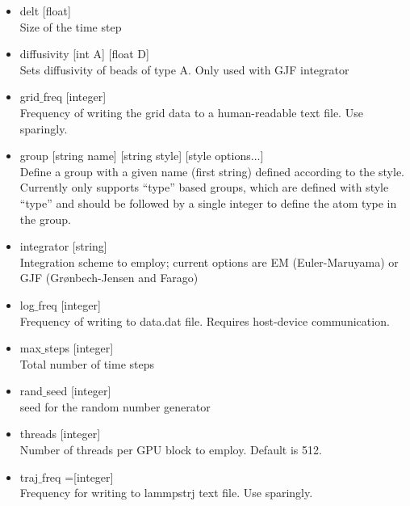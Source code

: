 \documentclass[12pt]{article}
\begin{document}
\begin{itemize}
    
    \item
    delt [float]
    \\[8pt]
    Size of the time step
    
    
    \item
    diffusivity [int A] [float D]
    \\[8pt]
    Sets diffusivity of beads of type A. Only used with GJF integrator
    
    
    \item
    grid$\_$freq [integer]
    \\[8pt]
    Frequency of writing the grid data to a human-readable text file. Use sparingly.
    
	\item
	group [string name] [string style] [style options...]
	\\[8pt]
	Define a group with a given name (first string) defined according to the style. Currently only supports ``type'' based groups, which are defined with style ``type'' and should be followed by a single integer to define the atom type in the group.

  
  	\item
    integrator [string]
    \\[8pt]
    Integration scheme to employ; current options are EM (Euler-Maruyama) or GJF (Gr{\o}nbech-Jensen and Farago)


	\item
	log$\_$freq [integer]
	\\[8pt]
	Frequency of writing to data.dat file. Requires host-device communication.
	
	
	
	\item
	max$\_$steps [integer]
	\\[8pt]
	Total number of time steps
    
    
    \item
    rand$\_$seed [integer]
    \\[8pt]
    seed for the random number generator
    
    
  \item
    threads [integer]
    \\[8pt]
    Number of threads per GPU block to employ. Default is 512.
    
    
    

  \item
    traj$\_$freq =[integer]
    \\[8pt]
    Frequency for writing to lammpstrj text file. Use sparingly.


\end{itemize}
\end{document}
